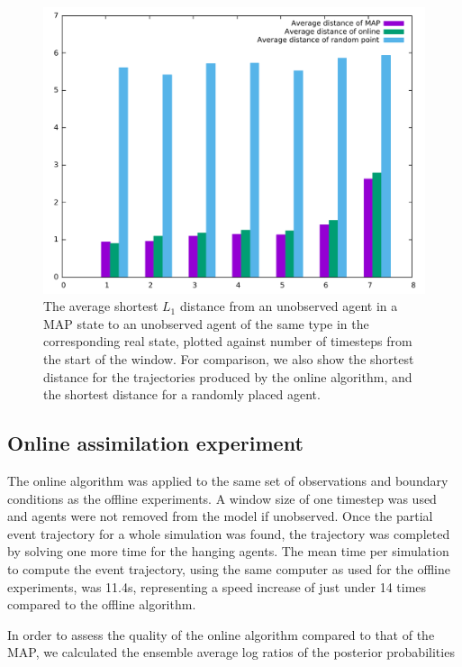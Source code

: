 \documentclass{article}
\begin{document}
\begin{figure}
\begin{center}
\includegraphics[width = 12cm]{distances2.pdf}
\end{center}
\caption{The average shortest $L_1$ distance from an unobserved agent in a MAP state to an unobserved agent of the same type in the corresponding real state, plotted against number of timesteps from the start of the window. For comparison, we also show the shortest distance for the trajectories produced by the online algorithm, and the shortest distance for a randomly placed agent.}
\label{distance}
\end{figure}

\subsection{Online assimilation experiment}

The online algorithm was applied to the same set of observations and boundary conditions as the offline experiments. A window size of one timestep was used and agents were not removed from the model if unobserved. Once the partial event trajectory for a whole simulation was found, the trajectory was completed by solving one more time for the hanging agents. The mean time per simulation to compute the event trajectory, using the same computer as used for the offline experiments, was 11.4s, representing a speed increase of just under 14 times compared to the offline algorithm.

In order to assess the quality of the online algorithm compared to that of the MAP, we calculated the ensemble average log ratios of the posterior probabilities
\end{document}
